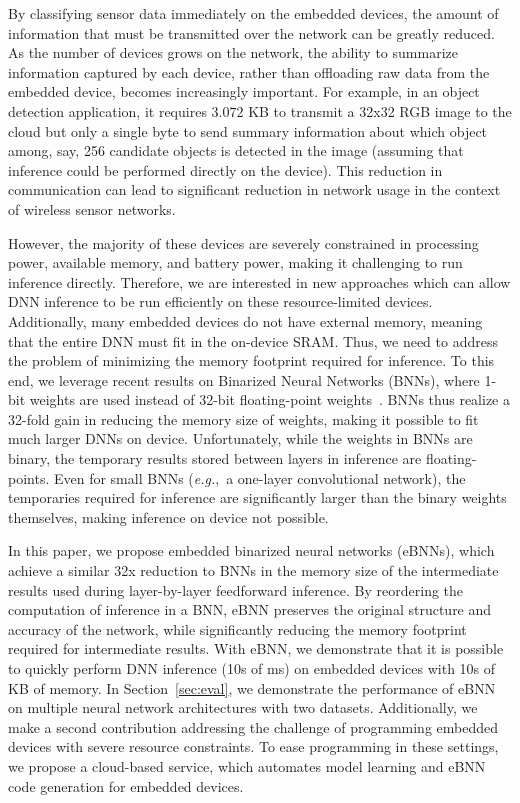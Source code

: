 \documentclass[10pt,emptycopyrightspace]{ewsn-proc}
\newcommand{\eg}{\emph{e.g.}}
\begin{document}
By classifying sensor data immediately on the embedded devices, the amount of information that must be transmitted over the network can be greatly reduced. As the number of devices grows on the network, the ability to summarize information captured by each device, rather than offloading raw data from the embedded device, becomes increasingly important. For example, in an object detection application, it requires $3.072$ KB to transmit a 32x32 RGB image to the cloud but only a single byte to send summary information about which object among, say, 256 candidate objects is detected in the image (assuming that inference could be performed directly on the device). This reduction in communication can lead to significant reduction in network usage in the context of wireless sensor networks.

However, the majority of these devices are severely constrained in processing power, available memory, and battery power, making it challenging to run inference directly. Therefore, we are interested in new approaches which can allow DNN inference to be run efficiently on these resource-limited devices. Additionally, many embedded devices do not have external memory, meaning that the entire DNN must fit in the on-device SRAM. Thus, we need to address the problem of minimizing the memory footprint required for inference. 
To this end, we leverage recent results on Binarized Neural Networks (BNNs), where 1-bit weights are used instead of 32-bit floating-point weights~\cite{courbariaux2015binaryconnect}. BNNs thus realize a 32-fold gain in reducing the memory size of weights, making it possible to fit much larger DNNs on device. Unfortunately, while the weights in BNNs are binary, the temporary results stored between layers in inference are floating-points. Even for small BNNs (\eg,~a one-layer convolutional network), the temporaries required for inference are significantly larger than the binary weights themselves, making inference on device not possible.


In this paper, we propose embedded binarized neural networks (eBNNs), which achieve a similar 32x reduction to BNNs in the memory size of the intermediate results used during layer-by-layer feedforward inference. By reordering the computation of inference in a BNN, eBNN preserves the original structure and accuracy of the network, while significantly reducing the memory footprint required for intermediate results. With eBNN, we demonstrate that it is possible to quickly perform DNN inference (10s of ms) on embedded devices with 10s of KB of memory. In Section~\ref{sec:eval}, we demonstrate the performance of eBNN on multiple neural network architectures with two datasets.
Additionally, we make a second contribution addressing the challenge of programming embedded devices with severe resource constraints. To ease programming in these settings, we propose a cloud-based service, which automates model learning and eBNN code generation for embedded devices.
\end{document}
